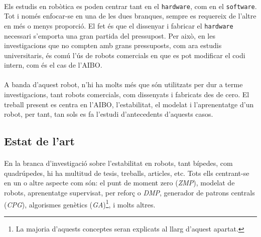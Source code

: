 \documentclass[12pt,a4paper,final,twoside]{article}
\begin{document}
\paragraph{}Els estudis en robòtica es poden centrar tant en el \texttt{hardware}, com en el \texttt{software}. Tot i només enfocar-se en una de les dues branques, sempre es requereix de l'altre en més o menys proporció. El fet és que el dissenyar i fabricar el \texttt{hardware} necessari s'emporta una gran partida del pressupost. Per això, en les investigacions que no compten amb grans pressuposts, com ara estudis universitaris, és comú l'ús de robots comercials en que es pot modificar el codi intern, com és el cas de l'AIBO.

\paragraph{}A banda d'aquest robot, n'hi ha molts més que són utilitzats per dur a terme investigacions, tant robots comercials, com dissenyats i fabricats des de cero. El treball present es centra en l'AIBO, l'estabilitat, el modelat i l'aprenentatge d'un robot, per tant, tan sols es fa l'estudi d'antecedents d'aquests casos.

\label{Estat-de-l'art}
\subsection*{Estat de l'art}



\paragraph{}En la branca d'investigació sobre l'estabilitat en robots, tant bípedes, com quadrúpedes, hi ha multitud de tesis, treballs, articles, etc. Tots ells centrant-se en un o altre aspecte com són: el punt de moment zero (\textit{ZMP}), modelat de robots, aprenentatge supervisat, per reforç o \textit{DMP}, generador de patrons centrals (\textit{CPG}), algorismes genètics (\textit{GA})\footnote{La majoria d'aquests conceptes seran explicats al llarg d'aquest apartat.}, i molts altres.
\end{document}
